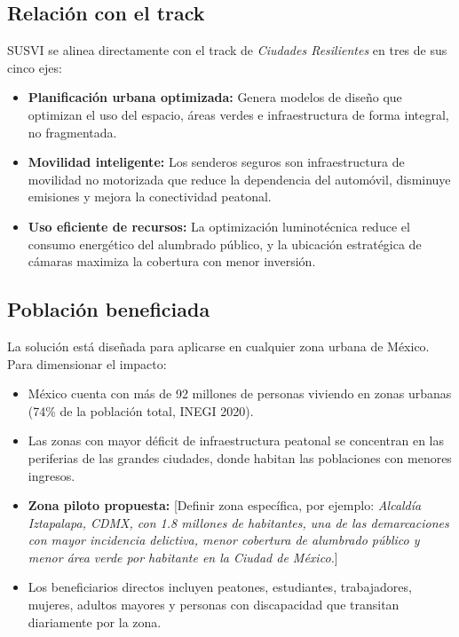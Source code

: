 \documentclass[12pt,a4paper]{article}
\begin{document}
\subsection{Relación con el track}

SUSVI se alinea directamente con el track de \textit{Ciudades Resilientes} en tres de sus cinco ejes:

\begin{itemize}[leftmargin=1.5cm]
    \item \textbf{Planificación urbana optimizada:} Genera modelos de diseño que optimizan el uso del espacio, áreas verdes e infraestructura de forma integral, no fragmentada.
    \item \textbf{Movilidad inteligente:} Los senderos seguros son infraestructura de movilidad no motorizada que reduce la dependencia del automóvil, disminuye emisiones y mejora la conectividad peatonal.
    \item \textbf{Uso eficiente de recursos:} La optimización luminotécnica reduce el consumo energético del alumbrado público, y la ubicación estratégica de cámaras maximiza la cobertura con menor inversión.
\end{itemize}

\subsection{Población beneficiada}

La solución está diseñada para aplicarse en cualquier zona urbana de México. Para dimensionar el impacto:

\begin{itemize}[leftmargin=1.5cm]
    \item México cuenta con más de 92 millones de personas viviendo en zonas urbanas (74\% de la población total, INEGI 2020).
    \item Las zonas con mayor déficit de infraestructura peatonal se concentran en las periferias de las grandes ciudades, donde habitan las poblaciones con menores ingresos.
    \item \textbf{Zona piloto propuesta:} [Definir zona específica, por ejemplo: \textit{Alcaldía Iztapalapa, CDMX, con 1.8 millones de habitantes, una de las demarcaciones con mayor incidencia delictiva, menor cobertura de alumbrado público y menor área verde por habitante en la Ciudad de México.}]
    \item Los beneficiarios directos incluyen peatones, estudiantes, trabajadores, mujeres, adultos mayores y personas con discapacidad que transitan diariamente por la zona.
\end{itemize}
\end{document}
